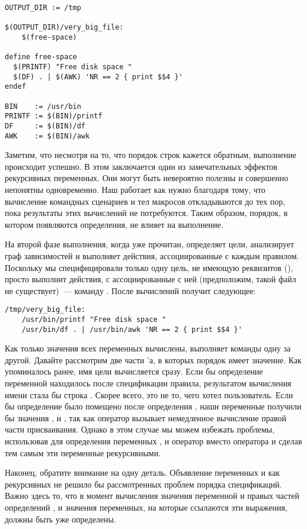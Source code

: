 {\footnotesize
\begin{verbatim}
OUTPUT_DIR := /tmp

$(OUTPUT_DIR)/very_big_file:
    $(free-space)

define free-space
  $(PRINTF) "Free disk space "
  $(DF) . | $(AWK) 'NR == 2 { print $$4 }'
endef

BIN    := /usr/bin
PRINTF := $(BIN)/printf
DF     := $(BIN)/df
AWK    := $(BIN)/awk
\end{verbatim}
}

Заметим, что несмотря на то, что порядок строк кажется обратным,
выполнение происходит успешно. В этом заключается один из
замечательных эффектов рекурсивных переменных. Они могут быть
невероятно полезны и совершенно непонятны одновременно. Наш
\Makefile{} работает как нужно благодаря тому, что вычисление
командных сценариев и тел макросов откладываются до тех пор, пока
результаты этих вычислений не потребуются. Таким образом, порядок, в
котором появляются определения, не влияет на выполнение.

На второй фазе выполнения, когда \Makefile{} уже прочитан, \GNUmake{}
определяет цели, анализирует граф зависимостей и выполняет действия,
ассоциированные с каждым правилом. Поскольку мы специфицировали только
одну цель, не имеющую реквизитов
(), \GNUmake{} просто выполнит
действия, с ассоциированные с ней (предположим, такой файл не
существует)~--- команду . После вычислений
\GNUmake{} получит следующее:

{\footnotesize
\begin{verbatim}
/tmp/very_big_file:
    /usr/bin/printf "Free disk space "
    /usr/bin/df . | /usr/bin/awk 'NR == 2 { print $$4 }'
\end{verbatim}
}

Как только значения всех переменных вычислены, \GNUmake{} выполняет
команды одну за другой. Давайте рассмотрим две части \Makefile{}'а, в
которых порядок имеет значение. Как упоминалось ранее, имя цели
 вычисляется сразу. Если бы
определение переменной  находилось после
спецификации правила, результатом вычисления имени стала бы строка
. Скорее всего, это не то, чего хотел
пользователь. Если бы определение  было помещено после
определения , наши переменные получили бы значения
,  и , так как оператор
\command{:=} вызывает немедленное вычисление правой части
присваивания. Однако в этом случае мы можем избежать проблемы,
использовав для определения переменных ,
 и  оператор \command{=} вместо оператора
\command{:=} и сделав тем самым эти переменные рекурсивными.

Наконец, обратите внимание на одну деталь. Объявление переменных
 и  как рекурсивных не решило бы
рассмотренных проблем порядка спецификаций. Важно здесь то, что в
момент вычисления значения переменной
 и правых частей определений
,  и  значения переменных,
на которые ссылаются эти выражения, должны быть уже определены.

